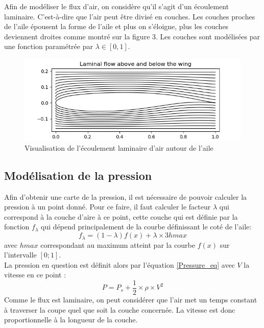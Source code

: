 \documentclass{article}
\begin{document}
Afin de modéliser le flux d'air, on considère qu'il s'agit d'un écoulement laminaire. C'est-à-dire que l'air peut être divisé en couches. Les couches proches de l'aile épousent la forme de l'aile et plus on s'éloigne, plus les couches deviennent droites comme montré sur la figure 3. Les couches sont modélisées par une fonction paramétrée par $\lambda \in [0, 1]$.

\begin{figure}[!htb]
    \centering
    \includegraphics[width=1.04\textwidth]{laminar_flow.png}
    \caption{Visualisation de l'écoulement laminaire d'air autour de l'aile}
    \label{laminar_flow}
\end{figure}

\subsection{Modélisation de la pression}

Afin d'obtenir une carte de la pression, il est nécessaire de pouvoir calculer la pression à un point donné.
Pour ce faire, il faut calculer le facteur $\lambda$ qui correspond à la couche d'aire à ce point, cette couche qui est définie par la fonction $f_{\lambda}$ qui dépend principalement de la courbe définissant le coté de l'aile:
\begin{equation}
    f_{\lambda} = (1-\lambda)f(x) + \lambda \times 3hmax
\end{equation}
avec $hmax$ correspondant au maximum atteint par la courbe $f(x)$ sur l'intervalle $[0;1]$.
\\
La pression en question est définit alors par l'équation \ref{Pressure_eq} avec $V$ la vitesse en ce point :
\begin{equation}
    \label{Pressure_eq}
    P = P_s + \frac{1}{2} \times \rho \times V^2
\end{equation}
Comme le flux est laminaire, on peut considérer que l'air met un temps constant à traverser la coupe quel que soit la couche concernée. La vitesse est donc proportionnelle à la longueur de la couche.
\end{document}
